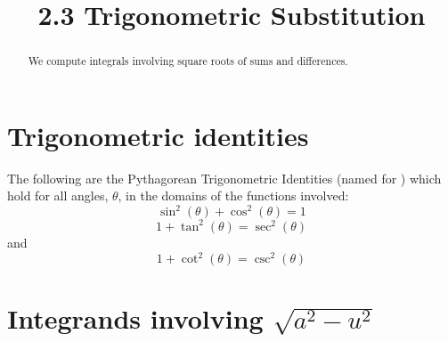 \documentclass{ximera}
\title{2.3 Trigonometric Substitution}
\begin{document}
\begin{abstract}
We compute integrals involving square roots of sums and differences.
\end{abstract}

\maketitle

\section{Trigonometric identities}

The following are the Pythagorean Trigonometric Identities 
(named for ) 
which hold for all angles,
$\theta$, in the domains of the functions involved:
\[
\sin^2(\theta) + \cos^2(\theta) = 1
\]
\[
1 + \tan^2(\theta) = \sec^2(\theta)
\]
and
\[
1 + \cot^2(\theta) = \csc^2(\theta)
\]



\section{Integrands involving $\sqrt{a^2 - u^2}$}
\end{document}
